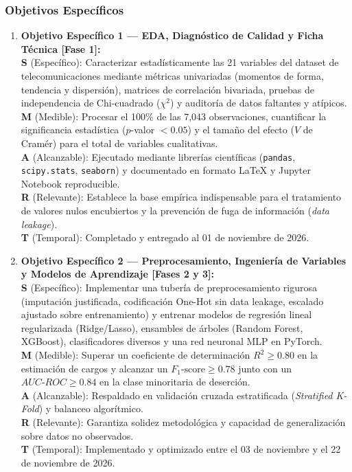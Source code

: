 \documentclass[11pt,letterpaper]{article}
\begin{document}
\subsubsection{Objetivos Específicos}
\begin{enumerate}
    \item \textbf{Objetivo Específico 1 — EDA, Diagnóstico de Calidad y Ficha Técnica [Fase 1]:}\\
    \textbf{S} (Específico): Caracterizar estadísticamente las 21 variables del dataset de telecomunicaciones mediante métricas univariadas (momentos de forma, tendencia y dispersión), matrices de correlación bivariada, pruebas de independencia de Chi-cuadrado ($\chi^2$) y auditoría de datos faltantes y atípicos.\\
    \textbf{M} (Medible): Procesar el 100\% de las 7,043 observaciones, cuantificar la significancia estadística ($p$-valor $< 0.05$) y el tamaño del efecto ($V$ de Cramér) para el total de variables cualitativas.\\
    \textbf{A} (Alcanzable): Ejecutado mediante librerías científicas (\texttt{pandas}, \texttt{scipy.stats}, \texttt{seaborn}) y documentado en formato LaTeX y Jupyter Notebook reproducible.\\
    \textbf{R} (Relevante): Establece la base empírica indispensable para el tratamiento de valores nulos encubiertos y la prevención de fuga de información (\textit{data leakage}).\\
    \textbf{T} (Temporal): Completado y entregado al 01 de noviembre de 2026.

    \item \textbf{Objetivo Específico 2 — Preprocesamiento, Ingeniería de Variables y Modelos de Aprendizaje [Fases 2 y 3]:}\\
    \textbf{S} (Específico): Implementar una tubería de preprocesamiento rigurosa (imputación justificada, codificación One-Hot sin data leakage, escalado ajustado sobre entrenamiento) y entrenar modelos de regresión lineal regularizada (Ridge/Lasso), ensambles de árboles (Random Forest, XGBoost), clasificadores diversos y una red neuronal MLP en PyTorch.\\
    \textbf{M} (Medible): Superar un coeficiente de determinación $R^2 \ge 0.80$ en la estimación de cargos y alcanzar un $F_1\text{-score} \ge 0.78$ junto con un $AUC\text{-}ROC \ge 0.84$ en la clase minoritaria de deserción.\\
    \textbf{A} (Alcanzable): Respaldado en validación cruzada estratificada (\textit{Stratified K-Fold}) y balanceo algorítmico.\\
    \textbf{R} (Relevante): Garantiza solidez metodológica y capacidad de generalización sobre datos no observados.\\
    \textbf{T} (Temporal): Implementado y optimizado entre el 03 de noviembre y el 22 de noviembre de 2026.


\end{enumerate}
\end{document}
